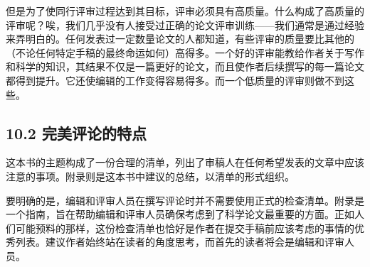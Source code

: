 但是为了使同行评审过程达到其目标，评审必须具有高质量。什么构成了高质量的评审呢？唉，我们几乎没有人接受过正确的论文评审训练——我们通常是通过经验来弄明白的。任何发表过一定数量论文的人都知道，有些评审的质量要比其他的（不论任何特定手稿的最终命运如何）高得多。一个好的评审能教给作者关于写作和科学的知识，其结果不仅是一篇更好的论文，而且使作者后续撰写的每一篇论文都得到提升。它还使编辑的工作变得容易得多。而一个低质量的评审则做不到这些。

\subsection*{10.2 完美评论的特点}
这本书的主题构成了一份合理的清单，列出了审稿人在任何希望发表的文章中应该注意的事项。附录则是这本书中建议的总结，以清单的形式组织。

要明确的是，编辑和评审人员在撰写评论时并不需要使用正式的检查清单。附录是一个指南，旨在帮助编辑和评审人员确保考虑到了科学论文最重要的方面。正如人们可能预料的那样，这份检查清单也恰好是作者在提交手稿前应该考虑的事情的优秀列表。建议作者始终站在读者的角度思考，而首先的读者将会是编辑和评审人员。


